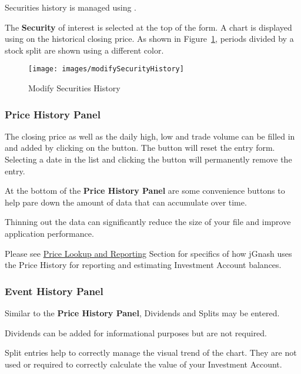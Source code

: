 \documentclass[letterpaper,12pt]{book}
\begin{document}
    Securities history is managed using .
    
    The \textbf{Security} of interest is selected at the top of the form.
    A chart is displayed using on the historical closing price.  
    As shown in Figure~\ref{fig:securitieshistorydialog}, periods divided by a stock split
    are shown using a different color.
    
     \begin{figure}[h]                          
        \caption{Modify Securities History}                  
        \label{fig:securitieshistorydialog}   
        \texttt{[image: images/modifySecurityHistory]}
    \end{figure}
    
    \subsubsection{Price History Panel}
        
    The closing price as well as the daily high, low and trade volume can be filled in and added by clicking
    on the  button.  The  button will reset the entry form.  Selecting a date in the list
    and clicking the  button will permanently remove the entry.
    
    At the bottom of the \textbf{Price History Panel} are some convenience buttons to help pare down the amount of data
    that can accumulate over time.  
    
    Thinning out the data can significantly reduce the size of your file and improve application performance.
    
    Please see \hyperref[sec:pricelookup]{Price Lookup and Reporting} Section for specifics of how jGnash uses
    the Price History for reporting and estimating Investment Account balances.
    
    \subsubsection{Event History Panel}
    
    Similar to the \textbf{Price History Panel}, Dividends and Splits may be entered.
    
    Dividends can be added for informational purposes but are not required.
    
    Split entries help to correctly manage the visual trend of the chart.  They are not used or required
    to correctly calculate the value of your Investment Account.
    
\end{document}
